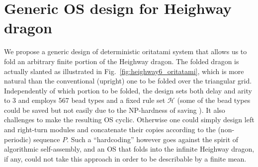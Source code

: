 	\section{Generic OS design for Heighway dragon}



We propose a generic design of deterministic oritatami system that allows us to fold an arbitrary finite portion of the Heighway dragon. 
The folded dragon is actually slanted as illustrated in Fig.~\ref{fig:heighway6_oritatami}, which is more natural than the conventional (upright) one to be folded over the triangular grid. 
Independently of which portion to be folded, the design sets both delay and arity to 3 and employs 567 bead types and a fixed rule set $\mathcal{H}$ (some of the bead types could be saved but not easily due to the NP-hardness of saving \cite{HanKim2017}). 
It also challenges to make the resulting OS cyclic. 
Otherwise one could simply design left and right-turn modules and concatenate their copies according to the (non-periodic) sequence $P$. 
Such a ``hardcoding'' however goes against the spirit of algorithmic self-assembly, and an OS that folds into the infinite Heighway dragon, if any, could not take this approach in order to be describable by a finite mean. 


